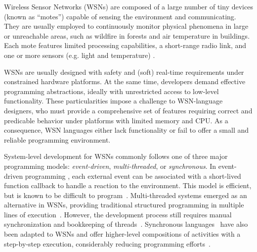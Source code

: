 \begin{comment}
System-level development for WSNs basically consists of abstracting access to 
the hardware and designing specially tweaked network protocols to be further 
integrated as services in higher-level applications or macro-programming 
systems~\cite{wsn.state_of_art,wsn.tos,wsn.survey}.

Our design is first compromised with the main principles that govern WSN 
development: \emph{resource minimization} and \emph{bug prevention}, as defined 
by Levis~\cite{wsn.decade}.

\end{comment}

Wireless Sensor Networks (WSNs) are composed of a large number of tiny devices 
(known as ``motes'') capable of sensing the environment and communicating.
They are usually employed to continuously monitor physical phenomena in large 
or unreachable areas, such as wildfire in forests and air temperature in 
buildings.
Each mote features limited processing capabilities, a short-range radio link, 
and one or more sensors (e.g. light and temperature) \cite{wsn.survey}.

WSNs are usually designed with safety and (soft) real-time requirements under 
constrained hardware platforms.
At the same time, developers demand effective programming abstractions, ideally 
with unrestricted access to low-level functionality.
%
These particularities impose a challenge to WSN-language designers, who must 
provide a comprehensive set of features requiring correct and predicable 
behavior under platforms with limited memory and CPU.
As a consequence, WSN languages either lack functionality or fail to offer a 
small and reliable programming environment.

System-level development for WSNs commonly follows one of three major 
programming models: \emph{event-driven}, \emph{multi-threaded}, or 
\emph{synchronous}.
%
In event-driven programming \cite{wsn.tos,wsn.contiki}, each external event can 
be associated with a short-lived function callback to handle a reaction to the 
environment.
This model is efficient,
but is known to be difficult to 
program~\cite{sync_async.cooperative,wsn.protothreads}.
%
Multi-threaded systems emerged as an alternative in WSNs, providing traditional 
structured programming in multiple lines of 
execution~\cite{wsn.protothreads,wsn.mantisos}.
However, the development process still requires manual synchronization and 
bookkeeping of threads~\cite{sync_async.threadsproblems}.
%
Synchronous languages~\cite{rp.twelve} have also been adapted to WSNs and offer 
higher-level compositions of activities with a step-by-step execution, 
considerably reducing programming efforts~\cite{wsn.sol,wsn.osm}.

